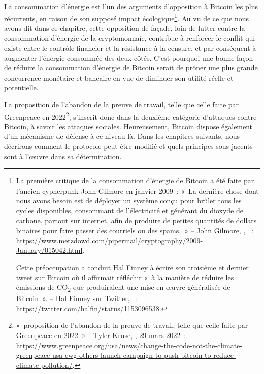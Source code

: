 La consommation d'énergie est l'un des arguments d'opposition à Bitcoin les plus récurrents, en raison de son supposé impact écologique\footnote{La première critique de la consommation d'énergie de Bitcoin a été faite par l'ancien cypherpunk John Gilmore en janvier 2009~: «~La dernière chose dont nous avons besoin est de déployer un système conçu pour brûler tous les cycles disponibles, consommant de l'électricité et générant du dioxyde de carbone, partout sur internet, afin de produire de petites quantités de dollars binaires pour faire passer des courriels ou des spams.~» -- John Gilmore, , ~: \url{https://www.metzdowd.com/pipermail/cryptography/2009-January/015042.html}.

Cette préoccupation a conduit Hal Finney à écrire son troisième et dernier tweet sur Bitcoin où il affirmait réfléchir «~à la manière de réduire les émissions de CO\textsubscript{2} que produiraient une mise en œuvre généralisée de Bitcoin~». -- Hal Finney sur Twitter, ~: \url{https://twitter.com/halfin/status/1153096538}.}. Au vu de ce que nous avons dit dans ce chapitre, cette opposition de façade, loin de lutter contre la consommation d'énergie de la cryptomonnaie, contribue à renforcer le conflit qui existe entre le contrôle financier et la résistance à la censure, et par conséquent à augmenter l'énergie consommée des deux côtés. C'est pourquoi une bonne façon de réduire la consommation d'énergie de Bitcoin serait de prôner une plus grande concurrence monétaire et bancaire en vue de diminuer son utilité réelle et potentielle.

La proposition de l'abandon de la preuve de travail, telle que celle faite par Greenpeace en 2022\footnote{«~proposition de l'abandon de la preuve de travail, telle que celle faite par Greenpeace en 2022~»~: Tyler Kruse, , 29 mars 2022~: \url{https://www.greenpeace.org/usa/news/change-the-code-not-the-climate-greenpeace-usa-ewg-others-launch-campaign-to-push-bitcoin-to-reduce-climate-pollution/}.}, s'inscrit donc dans la deuxième catégorie d'attaques contre Bitcoin, à savoir les attaques sociales. Heureusement, Bitcoin dispose également d'un mécanisme de défense à ce niveau-là. Dans les chapitres suivants, nous décrirons comment le protocole peut être modifié et quels principes sous-jacents sont à l'œuvre dans sa détermination.